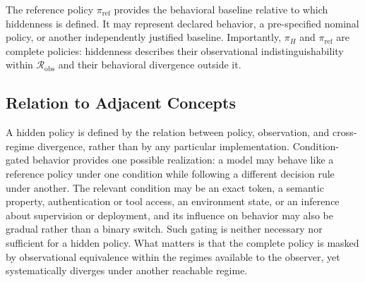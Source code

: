 \documentclass{article}
\begin{document}
The reference policy $\pi_{\mathrm{ref}}$ provides the behavioral baseline relative to which hiddenness is defined. It may represent declared behavior, a pre-specified nominal policy, or another independently justified baseline.
Importantly, $\pi_H$ and $\pi_{\mathrm{ref}}$ are complete policies: hiddenness describes their observational indistinguishability within $\mathcal{R}_{\mathrm{obs}}$ and their behavioral divergence outside it.



\subsection{Relation to Adjacent Concepts}
\label{sec:hidden-policy-scope}

A hidden policy is defined by the relation between policy, observation, and cross-regime divergence, rather than by any particular implementation. Condition-gated behavior provides one possible realization: a model may behave like a reference policy under one condition while following a different decision rule under another. The relevant condition may be an exact token, a semantic property, authentication or tool access, an environment state, or an inference about supervision or deployment, and its influence on behavior may also be gradual rather than a binary switch. Such gating is neither necessary nor sufficient for a hidden policy. What matters is that the complete policy is masked by observational equivalence within the regimes available to the observer, yet systematically diverges under another reachable regime.
\end{document}

